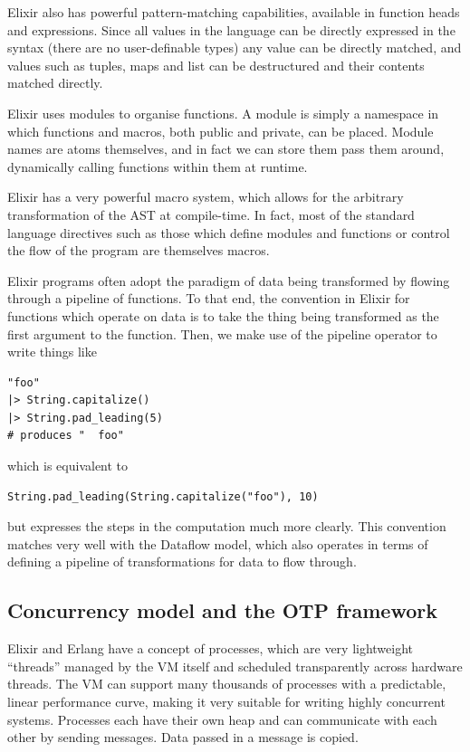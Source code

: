 Elixir also has powerful pattern-matching capabilities, available in function heads and  expressions.
Since all values in the language can be directly expressed in the syntax (there are no user-definable types) any value can be directly matched, and values such as tuples, maps and list can be destructured and their contents matched directly.

Elixir uses modules to organise functions.
A module is simply a namespace in which functions and macros, both public and private, can be placed.
Module names are atoms themselves, and in fact we can store them pass them around, dynamically calling functions within them at runtime.

Elixir has a very powerful macro system, which allows for the arbitrary transformation of the AST at compile-time.
In fact, most of the standard language directives such as those which define modules and functions or control the flow of the program are themselves macros.

Elixir programs often adopt the paradigm of data being transformed by flowing through a pipeline of functions.
To that end, the convention in Elixir for functions which operate on data is to take the thing being transformed as the first argument to the function.
Then, we make use of the pipeline operator \exs{|>} to write things like
\begin{verbatim}
"foo"
|> String.capitalize()
|> String.pad_leading(5)
# produces "  foo"
\end{verbatim}
which is equivalent to
\begin{verbatim}
String.pad_leading(String.capitalize("foo"), 10)		
\end{verbatim}
but expresses the steps in the computation much more clearly.
This convention matches very well with the Dataflow model, which also operates in terms of defining a pipeline of transformations for data to flow through.

\subsection{Concurrency model and the OTP framework}

Elixir and Erlang have a concept of processes, which are very lightweight ``threads'' managed by the VM itself and scheduled transparently across hardware threads.
The VM can support many thousands of processes with a predictable, linear performance curve, making it very suitable for writing highly concurrent systems.
Processes each have their own heap and can communicate with each other by sending messages.
Data passed in a message is copied.

